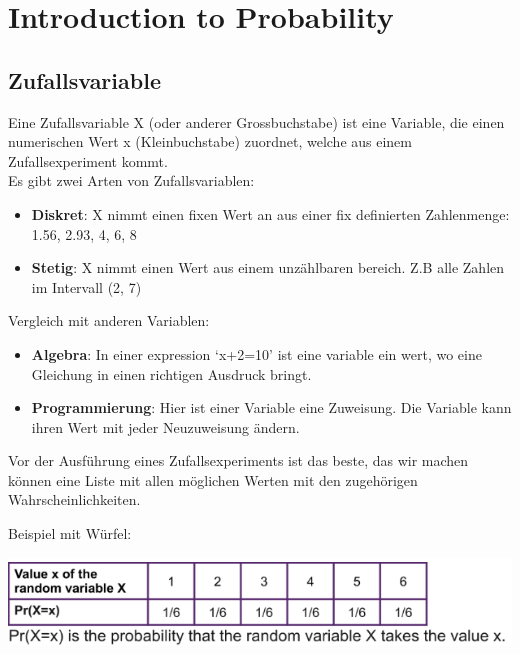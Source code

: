 \section{Introduction to Probability}
\subsection{Zufallsvariable}
Eine Zufallsvariable X (oder anderer Grossbuchstabe) ist eine Variable, die einen numerischen Wert x (Kleinbuchstabe) zuordnet, welche aus einem Zufallsexperiment kommt.\\

Es gibt zwei Arten von Zufallsvariablen:
\begin{itemize}
\item \textbf{Diskret}: X nimmt einen fixen Wert an aus einer fix definierten Zahlenmenge: {1.56, 2.93, 4, 6, 8}
\item \textbf{Stetig}: X nimmt einen Wert aus einem unzählbaren bereich. Z.B alle Zahlen im Intervall (2, 7)
\end{itemize}

Vergleich mit anderen Variablen:
\begin{itemize}
\item \textbf{Algebra}: In einer expression ‘x+2=10’ ist eine variable ein wert, wo eine Gleichung in einen richtigen Ausdruck bringt.
\item \textbf{Programmierung}: Hier ist einer Variable eine Zuweisung. Die Variable kann ihren Wert mit jeder Neuzuweisung ändern.
\end{itemize}

Vor der Ausführung eines Zufallsexperiments ist das beste, das wir machen können eine Liste mit allen möglichen Werten mit den zugehörigen Wahrscheinlichkeiten.

Beispiel mit Würfel:

\includegraphics[width=\linewidth]{img/dice.png}


